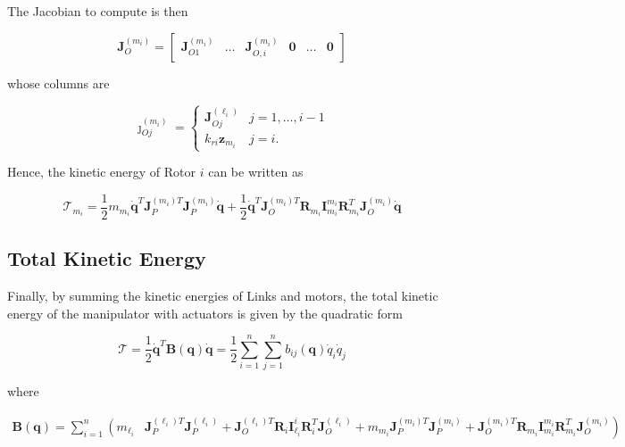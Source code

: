 \documentclass[10pt]{article}
\begin{document}
The Jacobian to compute is then

$$
\boldsymbol{J}_{O}^{\left(m_{i}\right)}=\left[\begin{array}{llllll}
\boldsymbol{J}_{O 1}^{\left(m_{i}\right)} & \ldots & \boldsymbol{J}_{O, i}^{\left(m_{i}\right)} & \mathbf{0} & \ldots & \mathbf{0}
\end{array}\right]
$$

whose columns are

$$
\boldsymbol{\jmath}_{O j}^{\left(m_{i}\right)}= \begin{cases}\boldsymbol{J}_{O j}^{\left(\ell_{i}\right)} & j=1, \ldots, i-1 \\ k_{r i} \boldsymbol{z}_{m_{i}} & j=i .\end{cases}
$$



Hence, the kinetic energy of Rotor $i$ can be written as

$$
\mathcal{T}_{m_{i}}=\frac{1}{2} m_{m_{i}} \dot{\boldsymbol{q}}^{T} \boldsymbol{J}_{P}^{\left(m_{i}\right) T} \boldsymbol{J}_{P}^{\left(m_{i}\right)} \dot{\boldsymbol{q}}+\frac{1}{2} \dot{\boldsymbol{q}}^{T} \boldsymbol{J}_{O}^{\left(m_{i}\right) T} \boldsymbol{R}_{m_{i}} \boldsymbol{I}_{m_{i}}^{m_{i}} \boldsymbol{R}_{m_{i}}^{T} \boldsymbol{J}_{O}^{\left(m_{i}\right)} \dot{\boldsymbol{q}}
$$

\subsection{Total Kinetic Energy}

Finally, by summing the kinetic energies of Links and motors, the total kinetic energy of the manipulator with actuators is given by the quadratic form

$$
\mathcal{T}=\frac{1}{2} \dot{\boldsymbol{q}}^{T} \boldsymbol{B}(\boldsymbol{q}) \dot{\boldsymbol{q}}=\frac{1}{2} \sum_{i=1}^{n} \sum_{j=1}^{n} b_{i j}(\boldsymbol{q}) \dot{q}_{i} \dot{q}_{j}
$$

where

$$
\begin{aligned}
\boldsymbol{B}(\boldsymbol{q})=\sum_{i=1}^{n}\left(m_{\ell_{i}}\right. & \boldsymbol{J}_{P}^{\left(\ell_{i}\right) T} \boldsymbol{J}_{P}^{\left(\ell_{i}\right)}+\boldsymbol{J}_{O}^{\left(\ell_{i}\right) T} \boldsymbol{R}_{i} \boldsymbol{I}_{\ell_{i}}^{i} \boldsymbol{R}_{i}^{T} \boldsymbol{J}_{O}^{\left(\ell_{i}\right)}+\left.  m_{m_{i}} \boldsymbol{J}_{P}^{\left(m_{i}\right) T} \boldsymbol{J}_{P}^{\left(m_{i}\right)}+\boldsymbol{J}_{O}^{\left(m_{i}\right) T} \boldsymbol{R}_{m_{i}} \boldsymbol{I}_{m_{i}}^{m_{i}} \boldsymbol{R}_{m_{i}}^{T} \boldsymbol{J}_{O}^{\left(m_{i}\right)}\right)
\end{aligned}
$$
\end{document}
